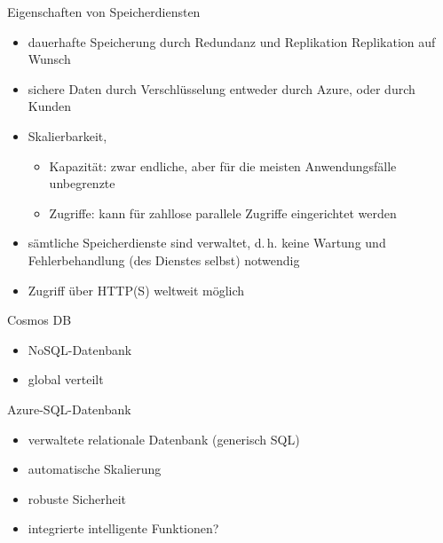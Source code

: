 \begin{flashcard}[\ ]{Eigenschaften von Speicherdiensten}
    \begin{itemize}
        \item dauerhafte Speicherung durch Redundanz und Replikation\newline
        Replikation auf Wunsch
        \item sichere Daten durch Verschlüsselung\newline
        entweder durch Azure, oder durch Kunden
        \item Skalierbarkeit,
        \begin{itemize}
            \item Kapazität: zwar endliche, aber für die meisten Anwendungsfälle unbegrenzte
            \item Zugriffe: kann für zahllose parallele Zugriffe eingerichtet werden
        \end{itemize}
        \item sämtliche Speicherdienste sind verwaltet, d.\,h. keine Wartung und Fehlerbehandlung (des Dienstes selbst) notwendig
        \item Zugriff über HTTP(S) weltweit möglich
    \end{itemize}
\end{flashcard}

\begin{flashcard}[Definition]{Cosmos DB}
    \begin{itemize}
        \item NoSQL-Datenbank
        \item global verteilt
    \end{itemize}
\end{flashcard}

\begin{flashcard}[Definition]{Azure-SQL-Datenbank}
    \begin{itemize}
        \item verwaltete relationale Datenbank (generisch SQL)
        \item automatische Skalierung
        \item robuste Sicherheit
        \item integrierte intelligente Funktionen?
    \end{itemize}
\end{flashcard}

